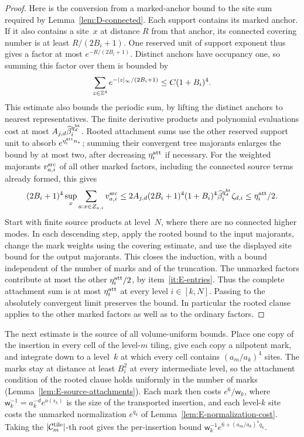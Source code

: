 \begin{proof}
Here is the conversion from a marked-anchor bound to the site sum required by Lemma~\ref{lem:D-connected}. Each support contains its marked anchor. If it also contains a site~$x$ at distance $R$ from that anchor, its connected covering number is at least $R/(2B_i+1)$. One reserved unit of support exponent thus gives a factor at most $e^{-R/(2B_i+1)}$. Distinct anchors have occupancy one, so summing this factor over them is bounded by
\begin{equation*}
 \sum_{z\in\mathbb{Z}^4}e^{-|z|_\infty/(2B_i+1)}\le C(1+B_i)^4.
\end{equation*}
This estimate also bounds the periodic sum, by lifting the distinct anchors to nearest representatives. The finite derivative products and polynomial evaluations cost at most $A_{j,d}\widehat\beta_i^{q^{\rm ht}_d}$. Rooted attachment sums use the other reserved support unit to absorb $e^{\eta^{\rm att}_in_\star}$; summing their convergent tree majorants enlarges the bound by at most two, after decreasing $\eta^{\rm att}_i$ if necessary. For the weighted majorants $v_{a,i}^{\rm src}$ of all other marked factors, including the connected source terms already formed, this gives
\begin{equation*}
 (2B_i+1)^4\sup_x\sum_{a:x\in Z_{a,i}}v_{a,i}^{\rm src}
 \le2A_{j,d}(2B_i+1)^4(1+B_i)^4
       \widehat\beta_i^{q^{\rm ht}_d}\zeta_{d,i}\le\eta^{\rm att}_i/2.
\end{equation*}
Start with finite source products at level~$N$, where there are no connected higher modes. In each descending step, apply the rooted bound to the input majorants, change the mark weights using the covering estimate, and use the displayed site bound for the output majorants. This closes the induction, with a bound independent of the number of marks and of the truncation. The unmarked factors contribute at most the other $\eta^{\rm att}_i/2$, by item~\ref{it:E-entries}. Thus the complete attachment sum is at most $\eta^{\rm att}_i$ at every level $i\in[k,N]$. Passing to the absolutely convergent limit preserves the bound. In particular the rooted clause applies to the other marked factors as well as to the ordinary factors.
\end{proof}

The next estimate is the source of all volume-uniform bounds. Place one copy of the insertion in every cell of the level-$m$ tiling, give each copy a nilpotent mark, and integrate down to a level~$k$ at which every cell contains $(a_m/a_k)^4$ sites. The marks stay at distance at least $B_i^2$ at every intermediate level, so the attachment condition of the rooted clause holds uniformly in the number of marks (Lemma~\ref{lem:E-source-attachments}). Each mark then costs $e^6/\mathsf w_k$, where $\mathsf w_k^{-1}=a_k^{-d}e^{o(s_k)}$ is the size of the transported insertion, and each level-$k$ site costs the unmarked normalization $e^{q_k}$ of Lemma~\ref{lem:E-normalization-cost}. Taking the $|\mathcal C^{\rm tile}_m|$-th root gives the per-insertion bound $\mathsf w_k^{-1}e^{6+(a_m/a_k)^4q_k}$.

